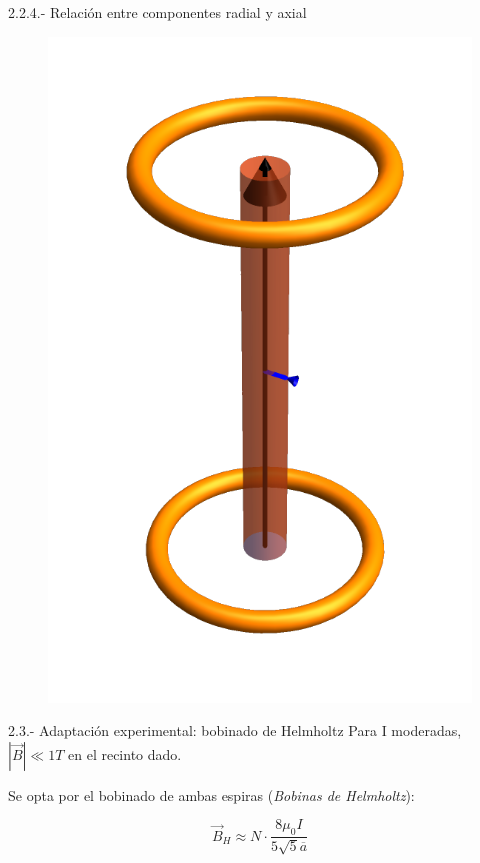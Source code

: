 \documentclass{beamer}
\providecommand{\abs}[1]{\left|#1\right|}
\begin{document}
\begin{frame}{2.2.4.- Relación entre componentes radial y axial}
\begin{figure}
        \hspace{8cm}\includegraphics[scale=0.3]{CYLELMOP4V2.pdf}
    \end{figure}
\end{frame}
\begin{frame}{2.3.- Adaptación experimental: bobinado de Helmholtz}
    Para I moderadas, $\abs{\vec{B}} \ll 1 T$ en el recinto dado.

    Se opta por el bobinado de ambas espiras (\emph{Bobinas de Helmholtz}):

    \begin{equation}
        \vec{B}_{H} \approx N \cdot \frac{8 \mu_{0} I}{5 \sqrt{5} \overline{a}}\nonumber
    \end{equation}
\end{frame}
\end{document}
